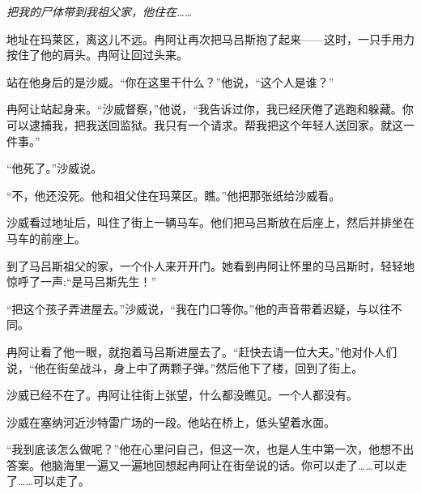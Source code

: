 \switchcolumn


\switchcolumn



\switchcolumn

\emph{把我的尸体带到我祖父家，他住在……}

\switchcolumn

地址在玛莱区，离这儿不远。冉阿让再次把马吕斯抱了起来——这时，一只手用力按住了他的肩头。冉阿让回过头来。

\switchcolumn

站在他身后的是沙威。“你在这里干什么？”他说，“这个人是谁？”

\switchcolumn

冉阿让站起身来。“沙威督察，”他说，“我告诉过你，我已经厌倦了逃跑和躲藏。你可以逮捕我，把我送回监狱。我只有一个请求。帮我把这个年轻人送回家。就这一件事。”

\switchcolumn

“他死了。”沙威说。

\switchcolumn

“不，他还没死。他和祖父住在玛莱区。瞧。”他把那张纸给沙威看。

\switchcolumn

沙威看过地址后，叫住了街上一辆马车。他们把马吕斯放在后座上，然后并排坐在马车的前座上。

\switchcolumn

到了马吕斯祖父的家，一个仆人来开开门。她看到冉阿让怀里的马吕斯时，轻轻地惊呼了一声:“是马吕斯先生！”

\switchcolumn

“把这个孩子弄进屋去。”沙威说，“我在门口等你。”他的声音带着迟疑，与以往不同。

\switchcolumn

冉阿让看了他一眼，就抱着马吕斯进屋去了。“赶快去请一位大夫。”他对仆人们说，“他在街垒战斗，身上中了两颗子弹。”然后他下了楼，回到了街上。

\switchcolumn

沙威已经不在了。冉阿让往街上张望，什么都没瞧见。一个人都没有。

\switchcolumn


\switchcolumn


\switchcolumn

沙威在塞纳河近沙特雷广场的一段。他站在桥上，低头望着水面。

\switchcolumn

“我到底该怎么做呢？”他在心里问自己，但这一次，也是人生中第一次，他想不出答案。他脑海里一遍又一遍地回想起冉阿让在街垒说的话。你可以走了……可以走了……可以走了。

